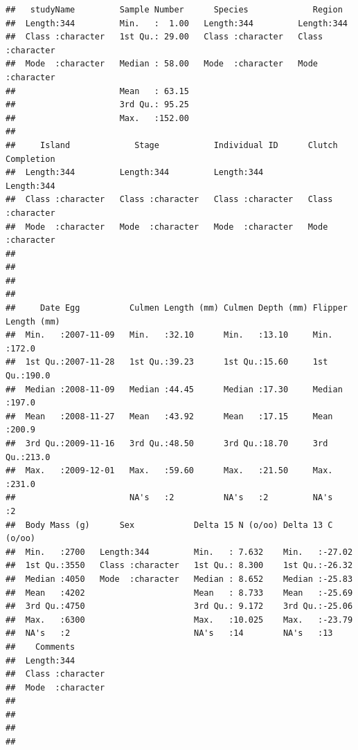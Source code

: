 \documentclass[
]{book}
\begin{document}
\begin{verbatim}
##   studyName         Sample Number      Species             Region         
##  Length:344         Min.   :  1.00   Length:344         Length:344        
##  Class :character   1st Qu.: 29.00   Class :character   Class :character  
##  Mode  :character   Median : 58.00   Mode  :character   Mode  :character  
##                     Mean   : 63.15                                        
##                     3rd Qu.: 95.25                                        
##                     Max.   :152.00                                        
##                                                                           
##     Island             Stage           Individual ID      Clutch Completion 
##  Length:344         Length:344         Length:344         Length:344        
##  Class :character   Class :character   Class :character   Class :character  
##  Mode  :character   Mode  :character   Mode  :character   Mode  :character  
##                                                                             
##                                                                             
##                                                                             
##                                                                             
##     Date Egg          Culmen Length (mm) Culmen Depth (mm) Flipper Length (mm)
##  Min.   :2007-11-09   Min.   :32.10      Min.   :13.10     Min.   :172.0      
##  1st Qu.:2007-11-28   1st Qu.:39.23      1st Qu.:15.60     1st Qu.:190.0      
##  Median :2008-11-09   Median :44.45      Median :17.30     Median :197.0      
##  Mean   :2008-11-27   Mean   :43.92      Mean   :17.15     Mean   :200.9      
##  3rd Qu.:2009-11-16   3rd Qu.:48.50      3rd Qu.:18.70     3rd Qu.:213.0      
##  Max.   :2009-12-01   Max.   :59.60      Max.   :21.50     Max.   :231.0      
##                       NA's   :2          NA's   :2         NA's   :2          
##  Body Mass (g)      Sex            Delta 15 N (o/oo) Delta 13 C (o/oo)
##  Min.   :2700   Length:344         Min.   : 7.632    Min.   :-27.02   
##  1st Qu.:3550   Class :character   1st Qu.: 8.300    1st Qu.:-26.32   
##  Median :4050   Mode  :character   Median : 8.652    Median :-25.83   
##  Mean   :4202                      Mean   : 8.733    Mean   :-25.69   
##  3rd Qu.:4750                      3rd Qu.: 9.172    3rd Qu.:-25.06   
##  Max.   :6300                      Max.   :10.025    Max.   :-23.79   
##  NA's   :2                         NA's   :14        NA's   :13       
##    Comments        
##  Length:344        
##  Class :character  
##  Mode  :character  
##                    
##                    
##                    
## 
\end{verbatim}
\end{document}
